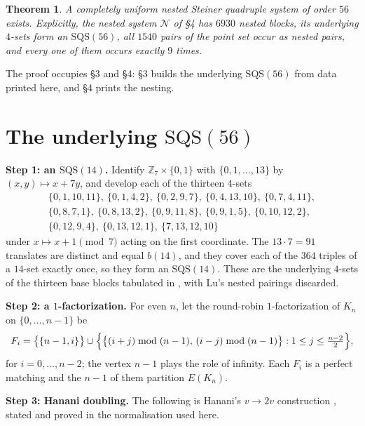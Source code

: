\documentclass[11pt]{amsart}
\newtheorem{theorem}{Theorem}
\newcommand{\SQS}{\mathrm{SQS}}
\begin{document}
\begin{theorem}\label{thm:main}
A completely uniform nested Steiner quadruple system of order $56$ exists.
Explicitly, the nested system $\mathcal N$ of \S4 has $6930$ nested blocks,
its underlying $4$-sets form an $\SQS(56)$, all $1540$ pairs of the point set
occur as nested pairs, and every one of them occurs exactly $9$ times.
\end{theorem}

The proof occupies \S3 and \S4: \S3 builds the underlying $\SQS(56)$ from data
printed here, and \S4 prints the nesting.

\section{The underlying \texorpdfstring{$\SQS(56)$}{SQS(56)}}

\noindent\textbf{Step 1: an $\SQS(14)$.} Identify $\mathbb Z_7\times\{0,1\}$
with $\{0,1,\ldots,13\}$ by $(x,y)\mapsto x+7y$, and develop each of the
thirteen $4$-sets
\begin{equation}\label{eq:base}
\begin{gathered}
 \{0,1,10,11\},\ \{0,1,4,2\},\ \{0,2,9,7\},\ \{0,4,13,10\},\ \{0,7,4,11\},\\
 \{0,8,7,1\},\ \{0,8,13,2\},\ \{0,9,11,8\},\ \{0,9,1,5\},\ \{0,10,12,2\},\\
 \{0,12,9,4\},\ \{0,13,12,1\},\ \{7,13,12,10\}
\end{gathered}
\end{equation}
under $x\mapsto x+1 \pmod 7$ acting on the first coordinate. The $13\cdot7=91$
translates are distinct and equal $b(14)$, and they cover each of the $364$
triples of a $14$-set exactly once, so they form an $\SQS(14)$. These are the
underlying $4$-sets of the thirteen base blocks tabulated in \cite{Lu},
with Lu's nested pairings discarded.

\noindent\textbf{Step 2: a $1$-factorization.} For even $n$, let the round-robin
$1$-factorization of $K_n$ on $\{0,\ldots,n-1\}$ be
\begin{equation}\label{eq:rr}
 F_i=\bigl\{\{n-1,i\}\bigr\}\cup
 \Bigl\{\bigl\{(i+j)\bmod (n-1),\,(i-j)\bmod (n-1)\bigr\}
 : 1\le j\le \tfrac{n-2}{2}\Bigr\},
\end{equation}
for $i=0,\ldots,n-2$; the vertex $n-1$ plays the role of infinity. Each $F_i$
is a perfect matching and the $n-1$ of them partition $E(K_n)$.

\noindent\textbf{Step 3: Hanani doubling.} The following is Hanani's
$v\to 2v$ construction \cite{Hanani}, stated and proved in the normalisation
used here.
\end{document}
